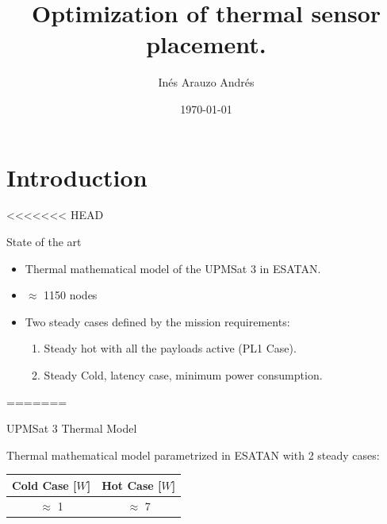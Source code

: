 \documentclass{cubeamer}
\title{Optimization of thermal sensor placement.}
\author[Inés Arauzo Andres]{Inés Arauzo Andrés}
\date{\today} %
\institute[UPM]{OAPES Project \\

\footnotesize{ IDR-UPM-ETSIAE}}
\begin{document}
\maketitle
\cutoc

\section{Introduction}

<<<<<<< HEAD
\begin{frame}{State of the art}
    \begin{minipage}{0.65\textwidth}
    \begin{itemize}
        \item Thermal mathematical model of the UPMSat 3 in ESATAN. 
        \item $\approx$ 1150 nodes
        \item Two steady cases defined by the mission requirements:
        \begin{enumerate}
            \item Steady hot with all the payloads active (PL1 Case).
            \item Steady Cold, latency case, minimum power consumption.
        \end{enumerate}
    \end{itemize}
=======
\begin{frame}{UPMSat 3 Thermal Model}
\begin{minipage}{0.4\textwidth}
      Thermal mathematical model parametrized in ESATAN with 2 steady cases:
    \begin{center}
    \begin{tabular}{cc}
    \toprule
    \textbf{Cold Case }[$W$] & \textbf{Hot Case } [$W$]\\ \midrule
    $\approx$ 1 & $\approx$ 7\\
    \bottomrule
    \end{tabular}
    \end{center}  
\end{minipage}
        \begin{minipage}{0.5\textwidth}
    \begin{flushright}

\end{flushright}
\end{minipage}
\end{frame}
\end{minipage}
\end{frame}
\end{document}
